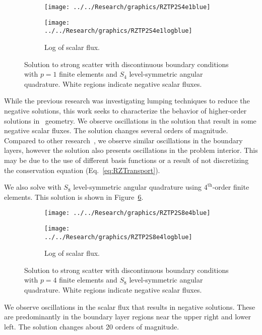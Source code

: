\documentclass[12pt,letterpaper]{article}
\begin{document}
%
\begin{figure}[!htb]
\centering
\begin{subfigure}{0.45\textwidth}
\centering
\texttt{[image: ../../Research/graphics/RZTP2S4e1blue]}
\label{fig:RZTP2S4e1blue}
\end{subfigure}%
\hspace{0.05\textwidth}
\begin{subfigure}{0.45\textwidth}
\centering
\texttt{[image: ../../Research/graphics/RZTP2S4e1logblue]}
\caption{Log of scalar flux.}
\label{fig:RZTP2S4e1logblue}
\end{subfigure}
\caption{Solution to strong scatter with discontinuous boundary conditions with $p=1$ finite elements and $S_4$ level-symmetric angular quadrature. White regions indicate negative scalar fluxes.}
\label{fig:RZTP2S4e1}
\end{figure}
%
While the previous research was investigating lumping techniques to reduce the negative solutions, this work seeks to characterize the behavior of higher-order solutions in \RZ\ geometry. We observe oscillations in the solution that result in some negative scalar fluxes. The solution changes several orders of magnitude. Compared to other research~\cite{PalmerDissertation}, we observe similar oscillations in the boundary layers, however the solution also presents oscillations in the problem interior. This may be due to the use of different basis functions or a result of not discretizing the conservation equation (Eq.~\ref{eq:RZTransport}).

We also solve with $S_8$ level-symmetric angular quadrature using $4^\text{th}$-order finite elements. This solution is shown in Figure~\ref{fig:RZTP2S8e4}.
%
\begin{figure}[!htb]
\centering
\begin{subfigure}{0.45\textwidth}
\centering
\texttt{[image: ../../Research/graphics/RZTP2S8e4blue]}
\label{fig:RZTP2S8e4blue}
\end{subfigure}%
\hspace{0.05\textwidth}
\begin{subfigure}{0.45\textwidth}
\centering
\texttt{[image: ../../Research/graphics/RZTP2S8e4logblue]}
\caption{Log of scalar flux.}
\label{fig:RZTP2S8e4logblue}
\end{subfigure}
\caption{Solution to strong scatter with discontinuous boundary conditions with $p=4$ finite elements and $S_8$ level-symmetric angular quadrature. White regions indicate negative scalar fluxes.}
\label{fig:RZTP2S8e4}
\end{figure}
%
We observe oscillations in the scalar flux that results in negative solutions. These are predominantly in the boundary layer regions near the upper right and lower left. The solution changes about 20 orders of magnitude.
\end{document}
